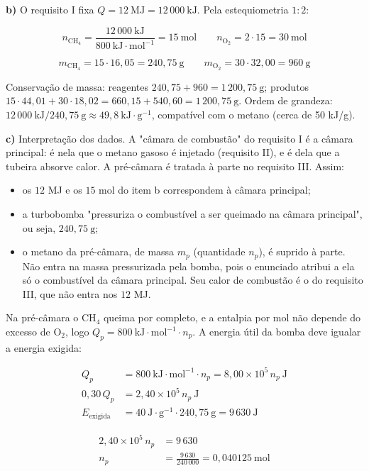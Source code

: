 \documentclass{article}%
\begin{document}
\textbf{b)} O requisito I fixa $Q=12\ \text{MJ}=12\,000\ \text{kJ}$. Pela estequiometria $1:2$:

\[ n_{\mathrm{CH_4}}=\frac{12\,000\ \text{kJ}}{800\ \text{kJ}\cdot\text{mol}^{-1}}=15\ \text{mol}\qquad n_{\mathrm{O_2}}=2\cdot15=30\ \text{mol} \]

\[ m_{\mathrm{CH_4}}=15\cdot16{,}05=240{,}75\ \text{g}\qquad m_{\mathrm{O_2}}=30\cdot32{,}00=960\ \text{g} \]

Conservação de massa: reagentes $240{,}75+960=1\,200{,}75\ \text{g}$; produtos $15\cdot44{,}01+30\cdot18{,}02=660{,}15+540{,}60=1\,200{,}75\ \text{g}$. Ordem de grandeza: $12\,000\ \text{kJ}/240{,}75\ \text{g}\approx49{,}8\ \text{kJ}\cdot\text{g}^{-1}$, compatível com o metano (cerca de 50 kJ/g).

\textbf{c)} Interpretação dos dados. A "câmara de combustão" do requisito I é a câmara principal: é nela que o metano gasoso é injetado (requisito II), e é dela que a tubeira absorve calor. A pré-câmara é tratada à parte no requisito III. Assim:
\begin{itemize}
\item os $12$ MJ e os $15$ mol do item b correspondem à câmara principal;
\item a turbobomba "pressuriza o combustível a ser queimado na câmara principal", ou seja, $240{,}75\ \text{g}$;
\item o metano da pré-câmara, de massa $m_p$ (quantidade $n_p$), é suprido à parte. Não entra na massa pressurizada pela bomba, pois o enunciado atribui a ela só o combustível da câmara principal. Seu calor de combustão é o do requisito III, que não entra nos $12$ MJ.
\end{itemize}

Na pré-câmara o CH$_4$ queima por completo, e a entalpia por mol não depende do excesso de O$_2$, logo $Q_p=800\ \text{kJ}\cdot\text{mol}^{-1}\cdot n_p$. A energia útil da bomba deve igualar a energia exigida:

\begin{align*}
Q_p &= 800\ \text{kJ}\cdot\text{mol}^{-1}\cdot n_p = 8{,}00\times10^{5}\,n_p\ \text{J}\\
0{,}30\,Q_p &= 2{,}40\times10^{5}\,n_p\ \text{J}\\
E_{\text{exigida}} &= 40\ \text{J}\cdot\text{g}^{-1}\cdot240{,}75\ \text{g}=9\,630\ \text{J}
\end{align*}

\begin{align*}
2{,}40\times10^{5}\,n_p &= 9\,630\\
n_p &= \frac{9\,630}{240\,000}=0{,}040125\ \text{mol}
\end{align*}
\end{document}
